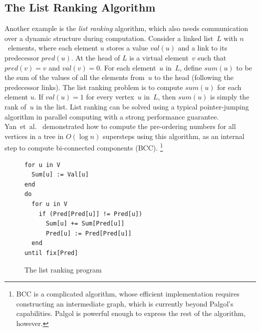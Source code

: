 \documentclass{sokendai_thesis} %
\begin{document}

\subsection{The List Ranking Algorithm}
\label{sec:list-ranking}

Another example is the \emph{list ranking} algorithm, which also needs communication over a dynamic structure during computation.
Consider a linked list~$L$ with $n$~elements, where each element $u$ stores a value $\mathit{val}(u)$ and a link to its predecessor $\mathit{pred}(u)$.
At the head of $L$ is a virtual element~$v$ such that $\mathit{pred}(v)=v$ and $\mathit{val}(v)=0$.
For each element~$u$ in~$L$, define $\mathit{sum}(u)$ to be the sum of the values of all the elements from~$u$ to the head (following the predecessor links).
The list ranking problem is to compute $\mathit{sum}(u)$ for each element $u$.
If $\mathit{val}(u)=1$ for every vertex~$u$ in~$L$, then $\mathit{sum}(u)$ is simply the rank of~$u$ in the list.
List ranking can be solved using a typical pointer-jumping algorithm in parallel computing with a strong performance guarantee.
Yan~et~al.~\cite{connectivity} demonstrated how to compute the pre-ordering numbers for all vertices in a tree in $O(\log n)$ supersteps using this algorithm, as an internal step to compute bi-connected components (BCC).%
\footnote{BCC is a complicated algorithm, whose efficient implementation requires constructing an intermediate graph, which is currently beyond Palgol's capabilities. Palgol is powerful enough to express the rest of the algorithm, however.}

\begin{figure}[t]
\begin{lstlisting}[basicstyle=\small\ttfamily]
for u in V
  Sum[u] := Val[u]
end
do
  for u in V
    if (Pred[Pred[u]] != Pred[u])
      Sum[u] += Sum[Pred[u]]
      Pred[u] := Pred[Pred[u]]
  end 
until fix[Pred]
\end{lstlisting}
\vspace{-2ex}
\caption{The list ranking program}
\label{fig:ranking-code}
\end{figure}
\end{document}
